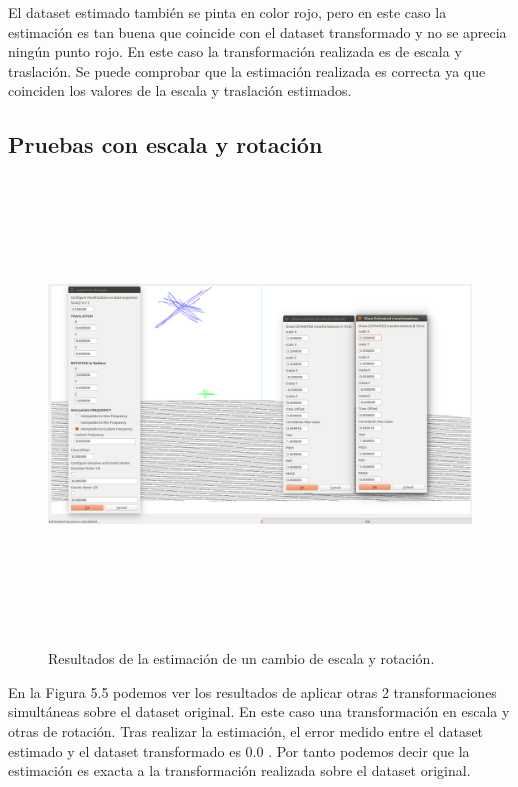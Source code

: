 El dataset estimado también se pinta en color rojo, pero en este caso la estimación es tan buena que coincide con el dataset transformado y no se aprecia ningún punto rojo.
En este caso la transformación realizada es de escala y traslación. Se puede comprobar que la estimación realizada es correcta ya que coinciden los valores de la escala y traslación estimados.

\subsection{Pruebas con escala y rotación}

\begin{figure}
\begin{center}
\label{fig:escalaRotationTest}\includegraphics[height=12.0cm,width=18.0cm]{img/cap6/Escala_Rotation_abba.png}
\hspace{0.5cm}

\end{center}

\caption{Resultados de la estimación de un cambio de escala y rotación.}
\end{figure}
En la Figura 5.5 podemos ver los resultados de aplicar otras 2 transformaciones simultáneas sobre el dataset original. En este caso una transformación en escala y otras de rotación. Tras realizar la estimación, el error medido entre el dataset estimado y el dataset transformado es 0.0 . Por tanto podemos decir que la estimación es exacta a la transformación realizada sobre el dataset original.


